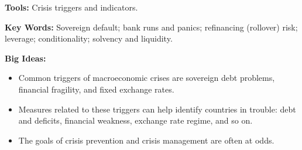 \textbf{Tools:} Crisis triggers and indicators.

\textbf{Key Words:} Sovereign default; bank runs and panics; refinancing (rollover) risk; leverage; conditionality;
solvency and liquidity.

\textbf{Big Ideas:}
\begin{itemize}
\item Common triggers of macroeconomic crises are sovereign debt problems, financial fragility,
and fixed exchange rates.

\item Measures related to these triggers can help identify countries in trouble:
debt and deficits, financial weakness, exchange rate regime, and so on.

\item The goals of crisis prevention and crisis management are often at odds.
\end{itemize}
